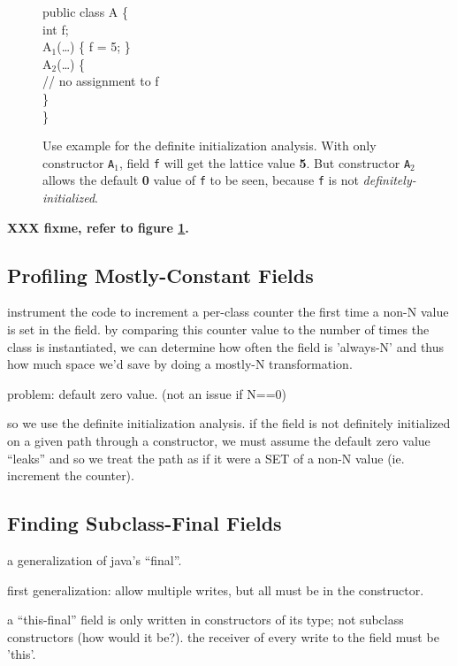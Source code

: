 \documentclass[preprint]{acmconf}
\begin{document}
\begin{figure}
\begin{samplecode}
public class A \{\\
\>int f;\\
\>A$_1$(\ldots) \{ f = 5; \}\\
\>A$_2$(\ldots) \{\\
\>\>// no assignment to f\\
\>\}\\
\}\\
\end{samplecode}
\caption{Use example for the definite initialization analysis.
With only constructor {\tt A$_1$}, field {\tt f} will get the
lattice value {\bf 5}.  But constructor {\tt A$_2$} allows the
default {\bf 0} value of {\tt f} to be seen, because {\tt f}
is not {\it definitely-initialized}.}
\label{fig:definit-example}
\end{figure}

{\bf XXX fixme, refer to figure \ref{fig:definit-example}.}

\subsection{Profiling Mostly-Constant Fields}
instrument the code to increment a per-class counter the first time a
non-N value is set in the field.  by comparing this counter value to
the number of times the class is instantiated, we can determine how
often the field is 'always-N' and thus how much space we'd save by
doing a mostly-N transformation.

problem: default zero value. (not an issue if N==0)

so we use the definite initialization analysis.  if the field is
not definitely initialized on a given path through a constructor,
we must assume the default zero value ``leaks'' and so we treat
the path as if it were a SET of a non-N value (ie. increment the
counter).

\subsection{Finding Subclass-Final Fields}
a generalization of java's ``final''.

first generalization: allow multiple writes, but all must be in the
constructor.

a ``this-final'' field is only written in constructors of its type;
not subclass constructors (how would it be?).  the receiver of every
write to the field must be 'this'.
\end{document}
